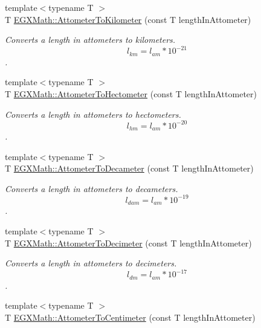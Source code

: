 \begin{DoxyCompactItemize}
{\footnotesize template$<$typename T $>$ }\\T \mbox{\hyperlink{group___e_g_x_math-_conversions-_length_conversions-_attometer-_s_i_gafc247d0f5b16a1e83c2f210812ee41e8}{E\+G\+X\+Math\+::\+Attometer\+To\+Kilometer}} (const T length\+In\+Attometer)
\begin{DoxyCompactList}\small\item\em Converts a length in attometers to kilometers. \[ l_{km}=l_{am} * 10^{-21} \]. \end{DoxyCompactList}\item 
{\footnotesize template$<$typename T $>$ }\\T \mbox{\hyperlink{group___e_g_x_math-_conversions-_length_conversions-_attometer-_s_i_gab810b8625e44d4bb227bdff1b0ab2056}{E\+G\+X\+Math\+::\+Attometer\+To\+Hectometer}} (const T length\+In\+Attometer)
\begin{DoxyCompactList}\small\item\em Converts a length in attometers to hectometers. \[ l_{hm}=l_{am} * 10^{-20} \]. \end{DoxyCompactList}\item 
{\footnotesize template$<$typename T $>$ }\\T \mbox{\hyperlink{group___e_g_x_math-_conversions-_length_conversions-_attometer-_s_i_gadfda74b37224249b3fb2644fb9611d95}{E\+G\+X\+Math\+::\+Attometer\+To\+Decameter}} (const T length\+In\+Attometer)
\begin{DoxyCompactList}\small\item\em Converts a length in attometers to decameters. \[ l_{dam}=l_{am} * 10^{-19} \]. \end{DoxyCompactList}\item 
{\footnotesize template$<$typename T $>$ }\\T \mbox{\hyperlink{group___e_g_x_math-_conversions-_length_conversions-_attometer-_s_i_gaa819fb588dcc42855d8e40578b54527e}{E\+G\+X\+Math\+::\+Attometer\+To\+Decimeter}} (const T length\+In\+Attometer)
\begin{DoxyCompactList}\small\item\em Converts a length in attometers to decimeters. \[ l_{dm}=l_{am} * 10^{-17} \]. \end{DoxyCompactList}\item 
{\footnotesize template$<$typename T $>$ }\\T \mbox{\hyperlink{group___e_g_x_math-_conversions-_length_conversions-_attometer-_s_i_gaff6439c15e3bb4a90595864e814960a7}{E\+G\+X\+Math\+::\+Attometer\+To\+Centimeter}} (const T length\+In\+Attometer)

\end{DoxyCompactItemize}
